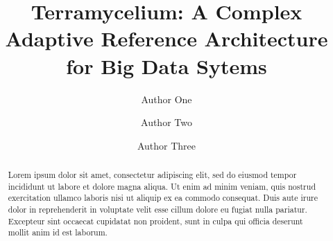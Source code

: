 \documentclass[preprint,12pt]{elsarticle}
\begin{document}
\begin{frontmatter}



\title{Terramycelium: A Complex Adaptive Reference Architecture for Big Data Sytems}


\author[inst1]{Author One}


\author[inst2]{Author Two}
\author[inst1,inst2]{Author Three}


\begin{abstract}
Lorem ipsum dolor sit amet, consectetur adipiscing elit, sed do eiusmod tempor incididunt ut labore et dolore magna aliqua. Ut enim ad minim veniam, quis nostrud exercitation ullamco laboris nisi ut aliquip ex ea commodo consequat. Duis aute irure dolor in reprehenderit in voluptate velit esse cillum dolore eu fugiat nulla pariatur. Excepteur sint occaecat cupidatat non proident, sunt in culpa qui officia deserunt mollit anim id est laborum.
\end{abstract}


\end{frontmatter}
\end{document}
